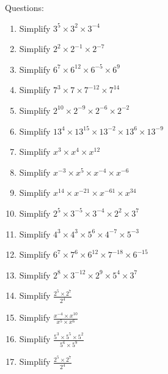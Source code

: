 \documentclass[16pt]{article}
\theoremstyle{remark}
\begin{document}
Questions:
\begin{enumerate}
\item Simplify $3^5 \times 3^2 \times 3^{-4}$
\vspace{5cm}
\newpage
\item Simplify $2^2 \times 2^{-1} \times 2^{-7}$
\vspace{5cm}
\item Simplify $6^7 \times 6^{12} \times 6^{-5} \times 6^9 $
\vspace{5cm}
\item Simplify $7^3 \times 7 \times 7^{-12} \times 7^{14}$
\vspace{5cm}
\item Simplify $2^{10} \times 2^{-9}\times 2^{-6}\times 2^{-2}$
\newpage

\item Simplify $13^4 \times 13^{15} \times 13^{-2} \times 13^6 \times 13^{-9}$
\vspace{5cm}
\item Simplify $x^3 \times x^{4} \times x^{12}  $
\vspace{5cm}
\item Simplify $x^{-3} \times x^5 \times x^{-4} \times x^{-6}$
\vspace{5cm}
\item Simplify $x^{14} \times x^{-21}\times x^{-61}\times x^{34}$
\newpage

\item Simplify $2^5 \times 3^{-5} \times 3^{-4} \times 2^2 \times 3^{7}$
\vspace{5cm}
\item Simplify $4^3 \times 4^{3} \times 5^{6} \times 4^{-7} \times 5^{-3}  $
\vspace{5cm}
\item Simplify $6^{7} \times 7^6 \times 6^{12} \times 7^{-18} \times 6^{-15}$
\vspace{5cm}
\item Simplify $2^{8} \times 3^{-12}\times 2^{9}\times 5^{4} \times 3^{7}$
\newpage


\item Simplify $\displaystyle{\frac{2^5 \times 2^7}{2^4}}$
\vspace{5cm}
\item Simplify $\displaystyle{\frac{x^{-4} \times x^{10}}{x^5 \times x^6}}$
\vspace{5cm}
\item Simplify $\displaystyle{\frac{5^3 \times 5^5 \times 5^2}{5^6 \times 5^9}}$
\vspace{5cm}
\item Simplify $\displaystyle{\frac{2^5 \times 2^7}{2^4}}$
\vspace{5cm}
\newpage


\end{enumerate}
\end{document}
